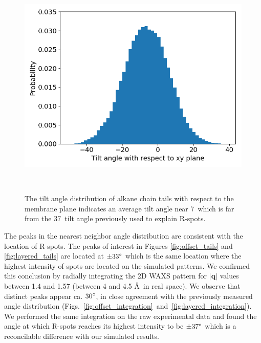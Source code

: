 \documentclass{article}
\begin{document}
  \begin{figure}
  \centering
  \includegraphics[width=0.5\linewidth]{tilt_dist.png}
  \caption{The tilt angle distribution of alkane chain tails with respect to the membrane plane
  indicates an average tilt angle near 7\degree~which is far from the 37\degree~tilt angle 
  previously used to explain R-spots.}~\label{fig:tilt}
  \end{figure}

  The peaks in the nearest neighbor angle distribution are consistent with the
  location of R-spots. The peaks of interest in Figures \ref{fig:offset_tails}
  and \ref{fig:layered_tails} are located at $\pm 33 \degree$ which is the same
  location where the highest intensity of spots are located on the simulated
  patterns. We confirmed this conclusion by radially integrating the 2D WAXS
  pattern for $\left|\mathbf{q}\right|$ values between 1.4 and 1.57 (between 4
  and 4.5 \AA~in real space). We observe that distinct peaks appear ca. $30
  \degree$, in close agreement with the previously measured angle distribution
  (Figs.~\ref{fig:offset_integration}~and~\ref{fig:layered_integration}). We
  performed the same integration on the raw experimental data and found the angle
  at which R-spots reaches its highest intensity to be $\pm 37 \degree$ which
  is a reconcilable difference with our simulated results.  
\end{document}
